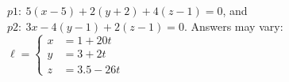 {$p1:\ 5 (x - 5) + 2 (y + 2) + 4 (z - 1)=0$, and \\
$p2:\ 3 x - 4 (y - 1) + 2 (z - 1)=0$.
}
{Answers may vary:\\
$\ell = \left\{\begin{aligned} x &=1+20t\\
y &= 3+2t\\
z&= 3.5-26t\end{aligned} \right.$
}

